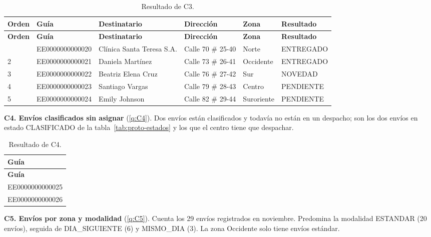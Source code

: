 {\singlespacing\footnotesize
\begin{longtable}{L{1.1cm} L{2.7cm} L{2.8cm} L{2.7cm} L{1.8cm} L{2.2cm}}
\caption{Resultado de C3.}
\label{tab:proto-c3}\\
\toprule
\textbf{Orden} & \textbf{Guía} & \textbf{Destinatario} & \textbf{Dirección} & \textbf{Zona} & \textbf{Resultado} \\
\midrule
\endfirsthead
\toprule
\textbf{Orden} & \textbf{Guía} & \textbf{Destinatario} & \textbf{Dirección} & \textbf{Zona} & \textbf{Resultado} \\
\midrule
\endhead
\bottomrule
{} & EE0000000000020 & Clínica Santa Teresa S.A. & Calle 70 \# 25-40 & Norte & ENTREGADO \\
2 & EE0000000000021 & Daniela Martínez & Calle 73 \# 26-41 & Occidente & ENTREGADO \\
3 & EE0000000000022 & Beatriz Elena Cruz & Calle 76 \# 27-42 & Sur & NOVEDAD \\
4 & EE0000000000023 & Santiago Vargas & Calle 79 \# 28-43 & Centro & PENDIENTE \\
5 & EE0000000000024 & Emily Johnson & Calle 82 \# 29-44 & Suroriente & PENDIENTE \\
\end{longtable}
\par}

\textbf{C4. Envíos clasificados sin asignar} (\ref{q:C4}). Dos
envíos están clasificados y todavía no están en un despacho; son los dos
envíos en estado CLASIFICADO de la tabla~\ref{tab:proto-estados} y los que
el centro tiene que despachar.

{\singlespacing\small
\begin{longtable}{L{3.6cm}}
\caption{Resultado de C4.}
\label{tab:proto-c4}\\
\toprule
\textbf{Guía} \\
\midrule
\endfirsthead
\toprule
\textbf{Guía} \\
\midrule
\endhead
\bottomrule
\endfoot
EE0000000000025 \\
EE0000000000026 \\
\end{longtable}
\par}

\textbf{C5. Envíos por zona y modalidad} (\ref{q:C5}). Cuenta los
29 envíos registrados en noviembre. Predomina la modalidad ESTANDAR (20
envíos), seguida de DIA\_SIGUIENTE (6) y MISMO\_DIA (3). La zona
Occidente solo tiene envíos estándar.

